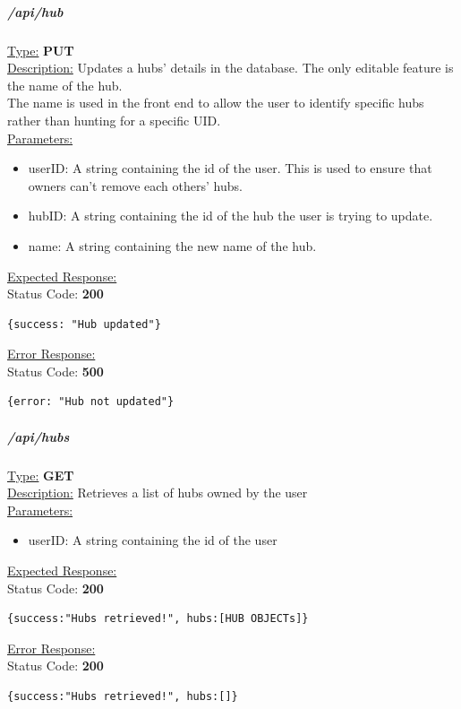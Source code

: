 \documentclass[draft,preprint,12pt,3p]{elsarticle}
\newcommand{\forceindent}{\leavevmode{\parindent=1em\indent}}
\begin{document}
\subparagraph*{/api/hub}
\underline{Type:} \textbf{PUT}\\

\underline{Description:} Updates a hubs' details in the database. The only editable feature is the name of the hub.\\
The name is used in the front end to allow the user to identify specific hubs rather than hunting for a specific UID.\\

\underline{Parameters:}
\begin{itemize}
\item userID: A string containing the id of the user. This is used to ensure that owners can't remove each others' hubs.

\item hubID: A string containing the id of the hub the user is trying to update.

\item name: A string containing the new name of the hub.
\end{itemize}

\underline{Expected Response:}\\[5pt]
\forceindent Status Code: \textbf{200} \\
\begin{verbatim}
{success: "Hub updated"}
\end{verbatim}

\underline{Error Response:}\\[5pt]
\forceindent Status Code: \textbf{500} \\
\begin{verbatim}
{error: "Hub not updated"}
\end{verbatim}

\subparagraph*{/api/hubs}
\underline{Type:} \textbf{GET}\\

\underline{Description:} Retrieves a list of hubs owned by the user\\

\underline{Parameters:}
\begin{itemize}
\item userID: A string containing the id of the user
\end{itemize}
\underline{Expected Response:}\\[5pt]
\forceindent Status Code: \textbf{200} \\
\begin{verbatim}
{success:"Hubs retrieved!", hubs:[HUB OBJECTs]}
\end{verbatim}
\underline{Error Response:}\\[5pt]
\forceindent Status Code: \textbf{200} \\
\begin{verbatim}
{success:"Hubs retrieved!", hubs:[]}
\end{verbatim}
\end{document}
